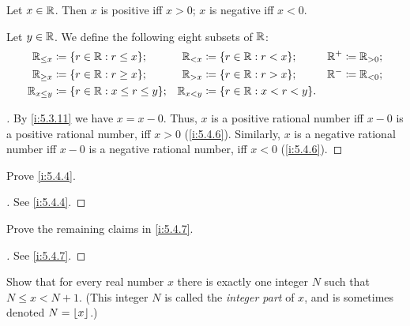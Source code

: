 \begin{ac}\label{i:ac:5.4.3}
  Let \(x \in \mathbb{R}\).
  Then \(x\) is positive iff \(x > 0\);
  \(x\) is negative iff \(x < 0\).

  Let \(y \in \mathbb{R}\).
  We define the following eight subsets of \(\mathbb{R}\):
  \begin{align*}
    \R_{\leq x}   & \coloneqq \set{r \in \R : r \leq x};        & \R_{< x}   & \coloneqq \set{r \in \R : r < x};     & \R^+ & \coloneqq \R_{> 0}; \\
    \R_{\geq x}   & \coloneqq \set{r \in \R : r \geq x};        & \R_{> x}   & \coloneqq \set{r \in \R : r > x};     & \R^- & \coloneqq \R_{< 0}; \\
    \R_{x \leq y} & \coloneqq \set{r \in \R : x \leq r \leq y}; & \R_{x < y} & \coloneqq \set{r \in \R : x < r < y}. &      &
  \end{align*}
\end{ac}

\begin{proof}[]
  By \cref{i:5.3.11} we have \(x = x - 0\).
  Thus, \(x\) is a positive rational number iff \(x - 0\) is a positive rational number, iff \(x > 0\) (\cref{i:5.4.6}).
  Similarly, \(x\) is a negative rational number iff \(x - 0\) is a negative rational number, iff \(x < 0\) (\cref{i:5.4.6}).
\end{proof}

\exercisesection

\begin{ex}\label{i:ex:5.4.1}
  Prove \cref{i:5.4.4}.
\end{ex}

\begin{proof}[]
  See \cref{i:5.4.4}.
\end{proof}

\begin{ex}\label{i:ex:5.4.2}
  Prove the remaining claims in \cref{i:5.4.7}.
\end{ex}

\begin{proof}[]
  See \cref{i:5.4.7}.
\end{proof}

\begin{ex}\label{i:ex:5.4.3}
  Show that for every real number \(x\) there is exactly one integer \(N\) such that \(N \leq x < N + 1\).
  (This integer \(N\) is called the \emph{integer part} of \(x\), and is sometimes denoted \(N = \left\lfloor x\right\rfloor\).)
\end{ex}

